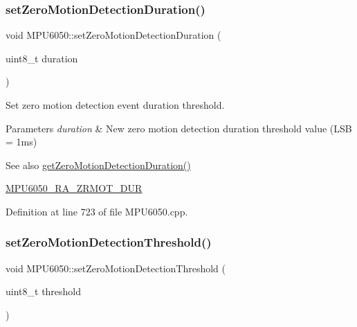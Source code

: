 \subsubsection{\texorpdfstring{setZeroMotionDetectionDuration()}{setZeroMotionDetectionDuration()}}
{\footnotesize\ttfamily void M\+P\+U6050\+::set\+Zero\+Motion\+Detection\+Duration (\begin{DoxyParamCaption}\item[{uint8\+\_\+t}]{duration }\end{DoxyParamCaption})}

Set zero motion detection event duration threshold. 
\begin{DoxyParams}{Parameters}
{\em duration} & New zero motion detection duration threshold value (L\+SB = 1ms) \\
\hline
\end{DoxyParams}
\begin{DoxySeeAlso}{See also}
\mbox{\hyperlink{classMPU6050_a04c0fcdcd0157b6dbf74d4901424801e}{get\+Zero\+Motion\+Detection\+Duration()}} 

\mbox{\hyperlink{MPU6050_8h_a57ad8b9e0c77ec27d41b60405ab57e1c}{M\+P\+U6050\+\_\+\+R\+A\+\_\+\+Z\+R\+M\+O\+T\+\_\+\+D\+UR}} 
\end{DoxySeeAlso}


Definition at line 723 of file M\+P\+U6050.\+cpp.


\begin{DoxyCode}{0}

\end{DoxyCode}
\mbox{\label{classMPU6050_a347a51fd25de20b9ead4659015ef793b}} 
\subsubsection{\texorpdfstring{setZeroMotionDetectionThreshold()}{setZeroMotionDetectionThreshold()}}
{\footnotesize\ttfamily void M\+P\+U6050\+::set\+Zero\+Motion\+Detection\+Threshold (\begin{DoxyParamCaption}\item[{uint8\+\_\+t}]{threshold }\end{DoxyParamCaption})}


